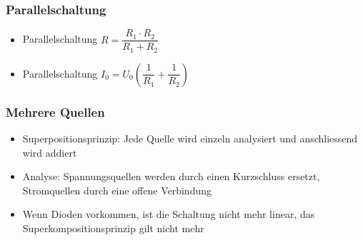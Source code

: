 \documentclass[8pt,a4paper]{scrartcl}
\begin{document}
\begin{multicols*}{3}
				\subsubsection{Parallelschaltung}	
					\begin{itemize}\itemsep0pt
						\item Parallelschaltung $R=\dfrac{R_{1} \cdot R_{2}}{R_{1} + R_{2}}$
						\item Parallelschaltung $I_{0}=U_{0}(\dfrac{1}{R_{1}} + \dfrac{1}{R_{2}})$
					\end{itemize}
					
				\subsubsection{Mehrere Quellen}	
					\begin{itemize}\itemsep0pt
						\item Superpositionsprinzip: Jede Quelle wird einzeln analysiert und anschliessend wird addiert
						\item Analyse: Spannungsquellen werden durch einen Kurzschluss ersetzt, Stromquellen durch eine offene Verbindung
						\item Wenn Dioden vorkommen, ist die Schaltung nicht mehr linear, das Superkompositionsprinzip gilt nicht mehr
					\end{itemize}
			
			

\end{multicols*}
\end{document}
